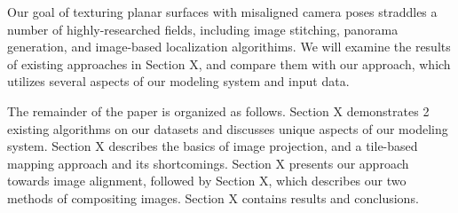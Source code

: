 \documentclass[]{spie}  %
\begin{document}
Our goal of texturing planar surfaces with misaligned camera poses
straddles a number of highly-researched fields, including image
stitching, panorama generation, and image-based localization
algorithims. We will examine the results of existing approaches in
Section X, and compare them with our approach, which utilizes several
aspects of our modeling system and input data.

The remainder of the paper is organized as follows. Section X demonstrates 2 existing algorithms on our datasets and discusses unique aspects of our modeling system. Section X describes the basics of image projection, and a tile-based mapping approach and its shortcomings. Section X presents our approach towards image alignment, followed by Section X, which describes our two methods of compositing images. Section X contains results and conclusions.




\end{document}
